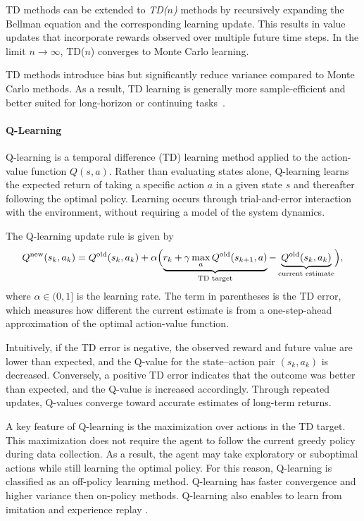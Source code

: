 TD methods can be extended to \emph{TD(\(n\))} methods by recursively expanding the Bellman equation and the corresponding learning update. This results in value updates that incorporate rewards observed over multiple future time steps. In the limit \( n \to \infty \), TD(\(n\)) converges to Monte Carlo learning. 

TD methods introduce bias but significantly reduce variance compared to Monte Carlo methods. As a result, TD learning is generally more sample-efficient and better suited for long-horizon or continuing tasks~\cite{brunton2022data}.

\paragraph{Q-Learning}
Q-learning is a temporal difference (TD) learning method applied to the action-value function \( Q(s,a) \). Rather than evaluating states alone, Q-learning learns the expected return of taking a specific action \( a \) in a given state \( s \) and thereafter following the optimal policy. Learning occurs through trial-and-error interaction with the environment, without requiring a model of the system dynamics.

The Q-learning update rule is given by
\[
Q^{\text{new}}(s_k,a_k)
=
Q^{\text{old}}(s_k,a_k)
+
\alpha \Bigl(
\underbrace{r_k + \gamma \max_{a} Q^{\text{old}}(s_{k+1},a)}_{\text{TD target}}
-
\underbrace{Q^{\text{old}}(s_k,a_k)}_{\text{current estimate}}
\Bigr),
\]
where \( \alpha \in (0,1] \) is the learning rate. The term in parentheses is the TD error, which measures how different the current estimate is from a one-step-ahead approximation of the optimal action-value function.

Intuitively, if the TD error is negative, the observed reward and future value are lower than expected, and the Q-value for the state--action pair \( (s_k,a_k) \) is decreased. Conversely, a positive TD error indicates that the outcome was better than expected, and the Q-value is increased accordingly. Through repeated updates, Q-values converge toward accurate estimates of long-term returns.

A key feature of Q-learning is the maximization over actions in the TD target. This maximization does not require the agent to follow the current greedy policy during data collection. As a result, the agent may take exploratory or suboptimal actions while still learning the optimal policy. For this reason, Q-learning is classified as an off-policy learning method. Q-learning has faster convergence and higher variance then on-policy methods. Q-learning also enables to learn from imitation and experience replay \cite{brunton2022data}. 

